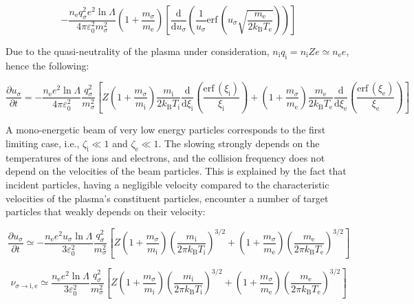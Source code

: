 \begin{equation}
    \label{eq-7-51}
    -\frac{n_\text{e} q_\sigma^2e^2\ln{\Lambda}}{4\pi\varepsilon_0^2m_\sigma^2}\left(1+\frac{m_\sigma}{m_\text{e}}\right)\left[\frac{\mathrm{d}}{\mathrm{d}u_\sigma}\left(\frac{1}{u_\sigma}\mathrm{erf}\,\left(u_\sigma\sqrt{\frac{m_\text{e}}{2k_\mathrm{B}T_\text{e}}}\right)\right)\right]
\end{equation}

Due to the quasi-neutrality of the plasma under consideration, $n_\mathrm{i}q_\mathrm{i}=n_\mathrm{i}Ze\simeq n_\text{e}e$, hence the following:

\begin{equation}
    \frac{\partial u_\sigma}{\partial t}=-\frac{n_\text{e}e^2\ln{\Lambda}}{4\pi\varepsilon_0^2}\frac{q_\sigma^2}{m_\sigma^2}\left[Z\left(1+\frac{m_\sigma}{m_\mathrm{i}}\right)\frac{m_\mathrm{i}}{2k_\mathrm{B}T_\mathrm{i}}\frac{\mathrm{d}}{\mathrm{d}\xi_\mathrm{i}}\left(\frac{\mathrm{erf}\,(\xi_\mathrm{i})}{\xi_\mathrm{i}}\right)+\left(1+\frac{m_\sigma}{m_\text{e}}\right)\frac{m_\text{e}}{2k_\mathrm{B}T_\text{e}}\frac{\mathrm{d}}{\mathrm{d}\xi_\text{e}}\left(\frac{\mathrm{erf}\,(\xi_\text{e})}{\xi_\text{e}}\right)\right]
\end{equation}

A mono-energetic beam of very low energy particles corresponds to the first limiting case, i.e., $\zeta_\mathrm{i}\ll1$ and $\zeta_\text{e}\ll1$. The slowing strongly depends on the temperatures of the ions and electrons, and the collision frequency does not depend on the velocities of the beam particles. This is explained by the fact that incident particles, having a negligible velocity compared to the characteristic velocities of the plasma's constituent particles, encounter a number of target particles that weakly depends on their velocity:

\begin{equation}
    \frac{\partial u_\sigma}{\partial t}\simeq-\frac{n_\text{e}e^2u_\sigma\ln{\Lambda}}{3\varepsilon_0^2}\frac{q_\sigma^2}{m_\sigma^2}\left[Z\left(1+\frac{m_\sigma}{m_\mathrm{i}}\right)\left(\frac{m_\mathrm{i}}{2\pi k_\mathrm{B}T_\mathrm{i}}\right)^{3/2}+\left(1+\frac{m_\sigma}{m_\text{e}}\right)\left(\frac{m_\text{e}}{2\pi k_\mathrm{B}T_\text{e}}\right)^{3/2}\right]
\end{equation}

\begin{equation}
    \nu_{\sigma\to\mathrm{i},\text{e}}\simeq\frac{n_\text{e}e^2\ln{\Lambda}}{3\varepsilon_0^2}\frac{q_\sigma^2}{m_\sigma^2}\left[Z\left(1+\frac{m_\sigma}{m_\mathrm{i}}\right)\left(\frac{m_\mathrm{i}}{2\pi k_\mathrm{B}T_\mathrm{i}}\right)^{3/2}+\left(1+\frac{m_\sigma}{m_\text{e}}\right)\left(\frac{m_\text{e}}{2\pi k_\mathrm{B}T_\text{e}}\right)^{3/2}\right]
\end{equation}

